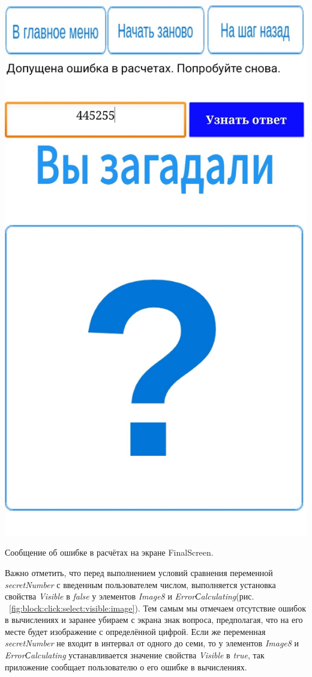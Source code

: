 \begin{marginfigure}[-2em]
\includegraphics{./graphics/programs/guess_numbers/finalScreen_Error_TheGuessingNumbersGame_AppInventor.jpg}
\caption[Сообщение об ошибке в расчётах на экране FinalScreen.]{Сообщение об ошибке в расчётах на экране FinalScreen.}
  \label{fig:block:final:screen:error}
\end{marginfigure}
Важно отметить, что перед выполнением условий сравнения переменной \textit{secretNumber} с введенным пользователем числом, выполняется установка свойства \textit{Visible} в \textit{false} у элементов \textit{Image8} и \textit{ErrorСalculating}(рис. ~\ref{fig:block:click:select:visible:image}).
Тем самым мы отмечаем отсутствие ошибок в вычислениях и заранее убираем с экрана знак вопроса, предполагая, что на его месте будет изображение с определённой цифрой. Если же переменная \textit{secretNumber} не входит в интервал от одного до семи, то у элементов \textit{Image8} и \textit{ErrorСalculating} устанавливается значение свойства \textit{Visible} в \textit{true}, 
так приложение сообщает пользователю о его ошибке в вычислениях.

